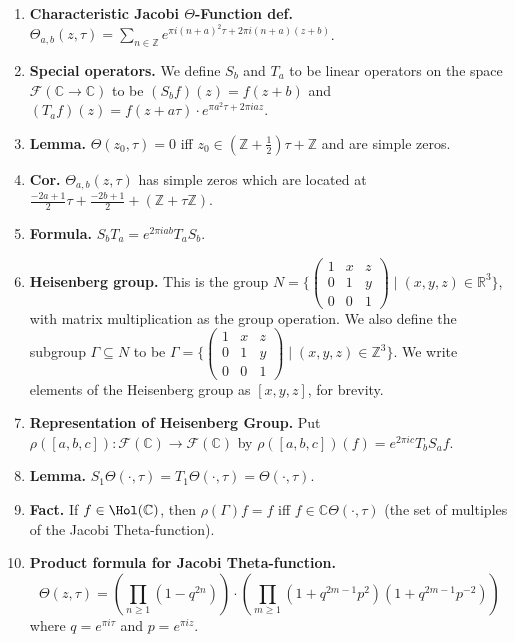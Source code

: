 \begin{enumerate}
	\item \textbf{Characteristic Jacobi $\Theta$-Function def. } $\Theta_{a,b}(z,\tau) = \sum_{n \in \mathbb{Z}} e^{\pi i(n+a)^2 \tau + 2\pi i(n+a)(z+b)}$. 
	\item \textbf{Special operators. } We define $S_b$ and $T_a$ to be linear operators on the space $\mathscr{F}(\mathbb{C} \to \mathbb{C})$ to be $(S_b f)(z) = f(z+b)$ and $(T_a f)(z) = f(z+a\tau) \cdot e^{\pi a^2 \tau + 2\pi i az}$. 
	\item \textbf{Lemma. } $\Theta(z_0,\tau) = 0$ iff $z_0 \in (\mathbb{Z} + \frac{1}{2})\tau + \mathbb{Z}$ and are simple zeros. 
	\item \textbf{Cor. } $\Theta_{a,b}(z,\tau)$ has simple zeros which are located at $\frac{-2a+1}{2}\tau + \frac{-2b+1}{2} + (\mathbb{Z} + \tau\mathbb{Z})$. 
	\item \textbf{Formula. } $S_b T_a = e^{2\pi iab} T_a S_b$. 
	\item \textbf{Heisenberg group. } This is the group $N = \{
	\begin{pmatrix}
	1 & x & z \\
	0 & 1 & y \\
	0 & 0 & 1
	\end{pmatrix}
	\mid (x,y,z) \in \mathbb{R}^3\}$, with matrix multiplication as the group operation. We also define the subgroup $\Gamma \subseteq N$ to be $\Gamma = \{
	\begin{pmatrix}
	1 & x & z \\
	0 & 1 & y \\
	0 & 0 & 1
	\end{pmatrix}
	\mid (x,y,z) \in \mathbb{Z}^3 \}$. We write elements of the Heisenberg group as $[x,y,z]$, for brevity. 
	\item \textbf{Representation of Heisenberg Group. } Put $\rho([a,b,c]): \mathscr{F}(\mathbb{C}) \to \mathscr{F}(\mathbb{C})$ by $\rho([a,b,c])(f) = e^{2\pi i c} T_b S_a f$. 
	\item \textbf{Lemma. } $S_1 \Theta(\cdot, \tau) = T_1 \Theta(\cdot, \tau) = \Theta(\cdot, \tau)$. 
	\item \textbf{Fact. } If $f \in \Hol(\mathbb{C})$, then $\rho(\Gamma)f = f$ iff $f \in \mathbb{C} \Theta(\cdot, \tau)$ (the set of multiples of the Jacobi Theta-function). 
	\item \textbf{Product formula for Jacobi Theta-function. } 
	$$
		\Theta(z,\tau) = \left(\prod_{n \geq 1}(1 - q^{2n})\right) \cdot \left(\prod_{m \geq 1}(1+q^{2m-1}p^2)(1+q^{2m-1}p^{-2})\right)
	$$
	where $q = e^{\pi i \tau}$ and $p = e^{\pi i z}$. 

\end{enumerate}
